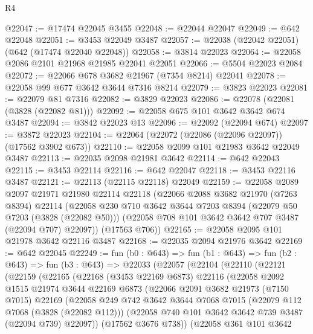 \begin{lexlean}{R4}
\begin{coremodule}
@22047 := @17474 @22045 @3455
@22048 := @22044 @22047
@22049 := @642 @22048
@22051 := @3453 @22049 @3487
@22057 := @22038 (@22042 @22051) (@642 (@17474 @22040 @22048))
@22058 := @3814 @22023
@22064 := @22058 @2086 @2101 @21968 @21985 @22041 @22051
@22066 := @5504 @22023 @2084
@22072 := @22066 @678 @3682 @21967 (@7354 @8214) @22041
@22078 := @22058 @99 @677 @3642 @3644 @7316 @8214
@22079 := @3823 @22023
@22081 := @22079 @81 @7316
@22082 := @3829 @22023
@22086 := @22078 (@22081 (@3828 (@22082 @81)))
@22092 := @22058 @675 @101 @3642 @3642 @674 @3487
@22094 := @3842 @22023 @13
@22096 := @22092 (@22094 @674)
@22097 := @3872 @22023
@22104 := @22064 (@22072 (@22086 (@22096 @22097)) (@17562 @3902 @673))
@22110 := @22058 @2099 @101 @21983 @3642 @22049 @3487
@22113 := @22035 @2098 @21981 @3642
@22114 := @642 @22043
@22115 := @3453 @22114
@22116 := @642 @22047
@22118 := @3453 @22116 @3487
@22121 := @22113 (@22115 @22118) @22049
@22159 := @22058
    @2089
    @2097
    @21971
    @21980
    @22114
    @22118
    (@22066
      @2088
      @3682
      @21970
      (@7263 @8394)
      @22114
      (@22058
        @230
        @710
        @3642
        @3644
        @7203
        @8394
        (@22079 @50 @7203 (@3828 (@22082 @50)))
        (@22058 @708 @101 @3642 @3642 @707 @3487 (@22094 @707) @22097))
      (@17563 @706))
@22165 := @22058 @2095 @101 @21978 @3642 @22116 @3487
@22168 := @22035 @2094 @21976 @3642
@22169 := @642 @22045
@22249 := fun (b0 : @643) =>
  fun (b1 : @643) =>
  fun (b2 : @643) =>
  fun (b3 : @643) =>
  @22033
    (@22057
      (@22104
        (@22110
          (@22121
            (@22159
              (@22165
                (@22168
                  (@3453 @22169 @6873)
                  @22116
                  (@22058
                    @2092
                    @1515
                    @21974
                    @3644
                    @22169
                    @6873
                    (@22066
                      @2091
                      @3682
                      @21973
                      (@7150 @7015)
                      @22169
                      (@22058
                        @249
                        @742
                        @3642
                        @3644
                        @7068
                        @7015
                        (@22079 @112 @7068 (@3828 (@22082 @112)))
                        (@22058 @740 @101 @3642 @3642 @739 @3487 (@22094 @739) @22097))
                      (@17562 @3676 @738))
                    (@22058
                      @361
                      @101
                      @3642

\end{coremodule}
\end{lexlean}
